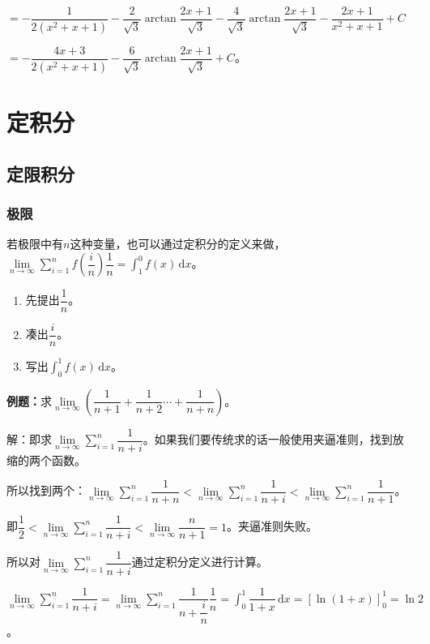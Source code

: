 \documentclass[UTF8, 12pt]{ctexart}
\begin{document}
$=-\dfrac{1}{2(x^2+x+1)}-\dfrac{2}{\sqrt{3}}\arctan\dfrac{2x+1}{\sqrt{3}}-\dfrac{4}{\sqrt{3}}\arctan\dfrac{2x+1}{\sqrt{3}}-\dfrac{2x+1}{x^2+x+1}+C$

$=-\dfrac{4x+3}{2(x^2+x+1)}-\dfrac{6}{\sqrt{3}}\arctan\dfrac{2x+1}{\sqrt{3}}+C$。

\section{定积分}

\subsection{定限积分}

\subsubsection{极限}

若极限中有$n$这种变量，也可以通过定积分的定义来做，$\lim\limits_{n\to\infty}\sum\limits_{i=1}^nf\left(\dfrac{i}{n}\right)\dfrac{1}{n}=\int_1^0f(x)\,\textrm{d}x$。

\begin{enumerate}
    \item 先提出$\dfrac{1}{n}$。
    \item 凑出$\dfrac{i}{n}$。
    \item 写出$\int_0^1f(x)\,\textrm{d}x$。
\end{enumerate}

\textbf{例题：}求$\lim\limits_{n\to\infty}\left(\dfrac{1}{n+1}+\dfrac{1}{n+2}\cdots+\dfrac{1}{n+n}\right)$。

解：即求$\lim\limits_{n\to\infty}\sum\limits_{i=1}^n\dfrac{1}{n+i}$。如果我们要传统求的话一般使用夹逼准则，找到放缩的两个函数。

所以找到两个：$\lim\limits_{n\to\infty}\sum\limits_{i=1}^n\dfrac{1}{n+n}<\lim\limits_{n\to\infty}\sum\limits_{i=1}^n\dfrac{1}{n+i}<\lim\limits_{n\to\infty}\sum\limits_{i=1}^n\dfrac{1}{n+1}$。

即$\dfrac{1}{2}<\lim\limits_{n\to\infty}\sum\limits_{i=1}^n\dfrac{1}{n+i}<\lim\limits_{n\to\infty}\dfrac{n}{n+1}=1$。夹逼准则失败。

所以对$\lim\limits_{n\to\infty}\sum\limits_{i=1}^n\dfrac{1}{n+i}$通过定积分定义进行计算。

$\lim\limits_{n\to\infty}\sum\limits_{i=1}^n\dfrac{1}{n+i}=\lim\limits_{n\to\infty}\sum\limits_{i=1}^n\dfrac{1}{n+\dfrac{i}{n}}\dfrac{1}{n}=\displaystyle{\int_0^1\dfrac{1}{1+x}\,\textrm{d}x}=[\ln(1+x)]_0^1=\ln2$。
\end{document}
